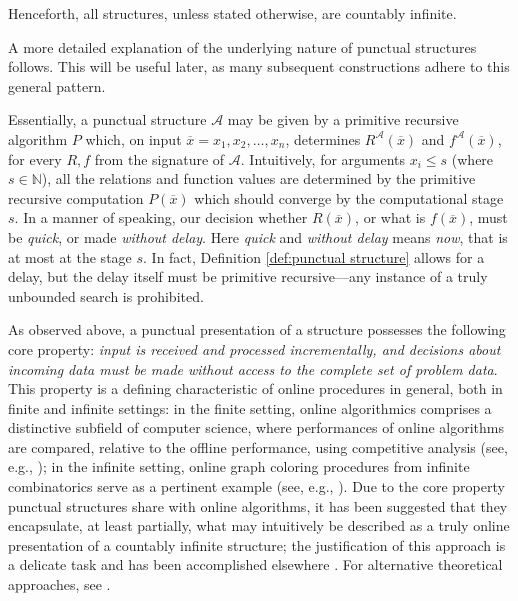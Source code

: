 \documentclass[a4paper,UKenglish,cleveref, autoref, thm-restate]{lipics-v2021}
\begin{document}
Henceforth, all structures, unless stated otherwise, are countably infinite.

A more detailed explanation of the underlying nature of punctual structures follows. This will be useful later, as many subsequent constructions adhere to this general pattern.


Essentially, a punctual structure $\mathcal A$ may be given by a primitive recursive algorithm $P$ which, on input $\overline{x} = x_1,x_2,\dots,x_n$, determines $R^\mathcal{A}(\overline x)$ and $f^\mathcal{A}(\overline x)$, for every $R,f$ from the signature of $\mathcal A$. Intuitively, for arguments $x_i \leq s$ (where $s\in\mathbb{N}$), all the relations and function values are determined by the primitive recursive computation $P(\overline{x})$ which should converge by the  computational stage $s$. In a manner of speaking, our decision whether $R(\overline x)$, or what is $f(\overline x)$, must be \emph{quick}, or made \emph{without delay}. Here \emph{quick} and \emph{without delay} means \emph{now}, that is at most at the stage $s$. In fact, Definition \ref{def:punctual structure} allows for a delay, but the delay itself must be primitive recursive---any instance of a truly unbounded search is prohibited.



As observed above, a punctual presentation of a structure possesses the following core property: \emph{input is received and processed incrementally, and decisions about incoming data must be made without access to the complete set of problem data}. This property is a defining characteristic of online procedures in general, both in finite and infinite settings: in the finite setting, online algorithmics comprises a distinctive subfield of computer science, where performances of online algorithms are compared, relative to the offline performance, using competitive analysis (see, e.g., \cite{borodin_online_2005}); in the infinite setting, online graph coloring procedures from infinite combinatorics serve as a pertinent example (see, e.g., \cite{kierstead_recursive_1998}). Due to the core property punctual structures share with online algorithms, it has been suggested that they encapsulate, at least partially, what may intuitively be described as a truly online presentation of a countably infinite structure; the justification of this approach is a delicate task and has been accomplished elsewhere \cite{kalimullin_algebraic_2017,bazhenov_foundations_2019}. For alternative theoretical approaches, see \cite{downey_foundations_2021,askes_online_2022}.
\end{document}
